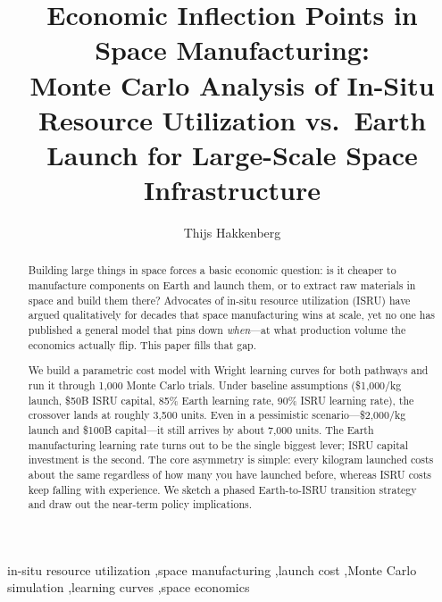 \documentclass[preprint,12pt]{elsarticle}
\begin{document}
\begin{frontmatter}

\title{Economic Inflection Points in Space Manufacturing:\\ Monte Carlo Analysis of In-Situ Resource Utilization vs.\ Earth Launch for Large-Scale Space Infrastructure}

\author[dyson]{Thijs Hakkenberg}

\address[dyson]{Project Dyson, Open Research Initiative}

\begin{abstract}
Building large things in space forces a basic economic question: is it cheaper to manufacture components on Earth and launch them, or to extract raw materials in space and build them there? Advocates of in-situ resource utilization (ISRU) have argued qualitatively for decades that space manufacturing wins at scale, yet no one has published a general model that pins down \emph{when}---at what production volume the economics actually flip. This paper fills that gap.

We build a parametric cost model with Wright learning curves for both pathways and run it through 1{,}000 Monte Carlo trials. Under baseline assumptions (\$1{,}000/kg launch, \$50B ISRU capital, 85\% Earth learning rate, 90\% ISRU learning rate), the crossover lands at roughly 3{,}500 units. Even in a pessimistic scenario---\$2{,}000/kg launch and \$100B capital---it still arrives by about 7{,}000 units. The Earth manufacturing learning rate turns out to be the single biggest lever; ISRU capital investment is the second. The core asymmetry is simple: every kilogram launched costs about the same regardless of how many you have launched before, whereas ISRU costs keep falling with experience. We sketch a phased Earth-to-ISRU transition strategy and draw out the near-term policy implications.
\end{abstract}

\begin{keyword}
in-situ resource utilization \sep space manufacturing \sep launch cost \sep Monte Carlo simulation \sep learning curves \sep space economics
\end{keyword}

\end{frontmatter}
\end{document}
